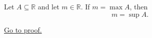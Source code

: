 \begin{proposition}
\label{prop:maximum-implies-supremum}
Let $A\subseteq\mathbb{R}$ and let $m\in\mathbb{R}$. If $m=\max A$, then
\[
  m=\sup A.
\]

\hyperref[prf:maximum-implies-supremum]{Go to proof.}
\end{proposition}